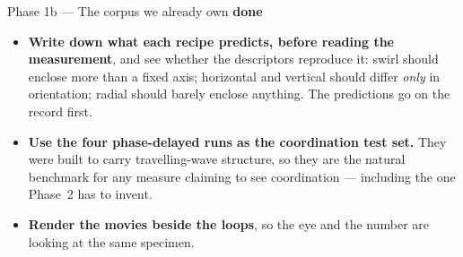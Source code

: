 \documentclass[11pt,a4paper]{article}
\newcommand{\code}[1]{\texttt{#1}}
\newcommand{\dn}{\textcolor{good}{\textbf{done}}}
\begin{document}
\begin{phasebox}{Phase 1b --- The corpus we already own \hfill \dn}
\begin{itemize}
Two things follow, and the second is the more useful. \emph{The merge changed the forward model},
quietly, and every archived trajectory in the corpus was produced by a version of the code that no
longer exists --- so the archive is evidence about a model we can no longer run, and the migrated
recipes are a slightly different model that we can. \emph{And the generate path is bit-deterministic},
unlike the fitting path, so once a recipe is migrated its runs are exactly reproducible.

\emph{Everything was written to a scratch root --- the archive was never the thing being
overwritten.} Cost, measured: 137\,s of start-up and 24\,s per frame, so the 250-frame recipes are
about two hours each. That is a fact Phase~2 needs before it budgets anything, and it is why the
merge question was settled on three frames rather than two hundred and fifty: identical operators
agree at frame one, and different ones separate at frame one, which is exactly what happened.

While writing it: the library kept backward-compatible aliases for three of the six renames
(\code{pulse\_to\_active\_stress}, \code{p2g}, \code{g2p}) and not for the other three
(\code{mpm\_drag}, \code{pulse\_stimulus}, \code{phase\_delay\_pulse}). There is no rule --- which
is how the same defect keeps recurring.
\item \textbf{Write down what each recipe predicts, before reading the measurement}, and see
whether the descriptors reproduce it: swirl should enclose more than a fixed axis; horizontal and
vertical should differ \emph{only} in orientation; radial should barely enclose anything. The
predictions go on the record first.
\item \textbf{Use the four phase-delayed runs as the coordination test set.} They were built to
carry travelling-wave structure, so they are the natural benchmark for any measure claiming to see
coordination --- including the one Phase~2 has to invent.
\item \textbf{Render the movies beside the loops}, so the eye and the number are looking at the
same specimen.
\end{itemize}
\end{phasebox}
\end{document}
